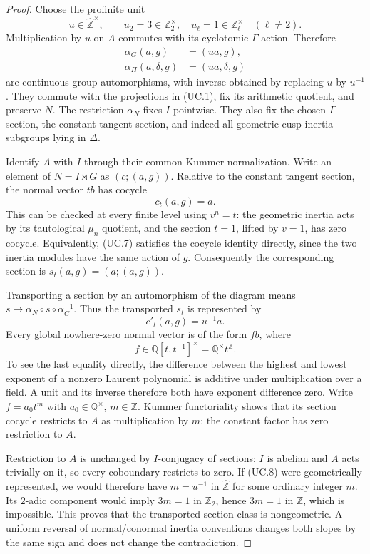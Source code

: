 \documentclass[11pt,a4paper]{article}
\theoremstyle{definition}
\begin{document}
\begin{proof}
Choose the profinite unit
\[
 u\in\widehat{\mathbb Z}^{\times},\qquad
 u_2=3\in\mathbb Z_2^\times,\quad
 u_\ell=1\in\mathbb Z_\ell^\times\quad(\ell\ne2).           \tag{UC.5}
\]
Multiplication by $u$ on $A$ commutes with its cyclotomic
$\Gamma$-action. Therefore
\[
 \begin{split}
 \alpha_G(a,g)&=(ua,g),\\
 \alpha_\Pi(a,\delta,g)&=(ua,\delta,g)
 \end{split}                                               \tag{UC.6}
\]
are continuous group automorphisms, with inverse obtained by
replacing $u$ by $u^{-1}$. They commute with the projections in
(UC.1), fix its arithmetic quotient, and preserve $N$.
The restriction $\alpha_N$ fixes $I$ pointwise. They also fix
the chosen $\Gamma$ section, the constant tangent section, and
indeed all geometric cusp-inertia subgroups lying in $\Delta$.

Identify $A$ with $I$ through their common Kummer normalization.
Write an element of $N=I\rtimes G$ as $(c;(a,g))$.
Relative to the constant tangent section, the normal vector
$t b$ has cocycle
\[
 c_t(a,g)=a.                                               \tag{UC.7}
\]
This can be checked at every finite level using $v^n=t$:
the geometric inertia acts by its tautological $\mu_n$ quotient,
and the section $t=1$, lifted by $v=1$, has zero cocycle.
Equivalently, (UC.7) satisfies the cocycle identity directly,
since the two inertia modules have the same action of $g$.
Consequently the corresponding section is
$s_t(a,g)=(a;(a,g))$.

Transporting a section by an automorphism of the diagram means
$s\mapsto\alpha_N\circ s\circ\alpha_G^{-1}$. Thus the
transported $s_t$ is represented by
\[
 c'_t(a,g)=u^{-1}a.                                       \tag{UC.8}
\]
Every global nowhere-zero normal vector is of the form
$f b$, where
\[
 f\in\mathbb Q[t,t^{-1}]^\times=\mathbb Q^\times t^{\mathbb Z}.
                                                               \tag{UC.9}
\]
To see the last equality directly, the difference between the
highest and lowest exponent of a nonzero Laurent polynomial
is additive under multiplication over a field. A unit and its
inverse therefore both have exponent difference zero.
Write $f=a_0t^m$ with $a_0\in\mathbb Q^\times$, $m\in\mathbb Z$.
Kummer functoriality shows that its section cocycle restricts
to $A$ as multiplication by $m$; the constant factor has
zero restriction to $A$.

Restriction to $A$ is unchanged by $I$-conjugacy of sections:
$I$ is abelian and $A$ acts trivially on it, so every coboundary
restricts to zero. If (UC.8) were geometrically represented,
we would therefore have $m=u^{-1}$ in
$\widehat{\mathbb Z}$ for some ordinary integer $m$.
Its $2$-adic component would imply $3m=1$ in $\mathbb Z_2$,
hence $3m=1$ in $\mathbb Z$, which is impossible.
This proves that the transported section class is nongeometric.
A uniform reversal of normal/conormal inertia conventions changes
both slopes by the same sign and does not change the contradiction.
\end{proof}
\end{document}
